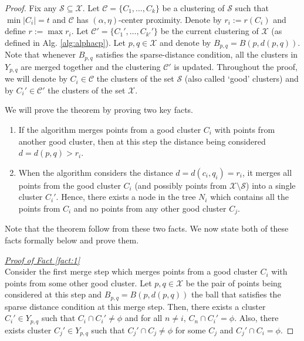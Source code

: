 \documentclass[11pt]{article}
\newcommand{\mc}{\mathcal}
\begin{document}
\begin{proof}
Fix any $\mc S \subseteq \mc X$. Let $\mc C = \{C_1, \ldots, C_k\}$ be a clustering of $\mc S$ such that $\min |C_i| = t$ and $\mc C$ has $(\alpha, \eta)$-center proximity. Denote by $r_i := r(C_i)$ and define $r := \max r_i$. Let $\mc C' = \{C_1', \ldots, C_{k'}'\}$ be the current clustering of $\mc X$ (as defined in Alg. \ref{alg:alphacp}). Let $p, q \in \mc X$ and denote by $B_{p, q} = B(p, d(p, q))$. Note that whenever $B_{p, q}$ satisfies the sparse-distance condition, all the clusters in $Y_{p, q}$ are merged together and the clustering $\mc C'$ is updated. Throughout the proof, we will denote by $C_i \in \mc C$ the clusters of the set $\mc S$ (also called `good' clusters) and by $C_i' \in \mc C'$ the clusters of the set $\mc X$.

\noindent We will prove the theorem by proving two key facts. %

\begin{enumerate}[nolistsep, noitemsep, label=\textbf{F.\arabic*}]
\renewcommand\labelitemi{$\diamond$}
\item \label{fact:1} If the algorithm merges points from a good cluster $C_i$ with points from another good cluster, then at this step the distance being considered $d = d(p,q) > r_i$.	
\item \label{fact:2} When the algorithm considers the distance $d = d(c_i, q_i) = r_i$, it merges all points from the good cluster $C_i$ (and possibly points from $\mc X\setminus \mc S$) into a single cluster $C_i'$. Hence, there exists a node in the tree $N_i$ which contains all the points from $C_i$ and no points from any other good cluster $C_j$. 	
\end{enumerate}
Note that the theorem follow from these two facts. We now state both of these facts formally below and prove them.

\noindent\textit{\underline{Proof of Fact \ref{fact:1} %
}}\\
Consider the first merge step which merges points from a good cluster $C_i$ with points from some other good cluster. Let $p, q \in \mc X$ be the pair of points being considered at this step and $B_{p,q} = B(p, d(p, q))$ the ball that satisfies the sparse distance condition at this merge step. Then, there exists a cluster $C_i' \in Y_{p,q}$ such that $C_i \cap C_i' \neq \phi$ and for all $n \neq i$, $C_n \cap C_i' = \phi$. Also, there exists cluster $C_j' \in Y_{p, q}$ such that $C_j' \cap C_j \neq \phi$ for some $C_j$ and $C_j' \cap C_i = \phi$.


\end{proof}
\end{document}
